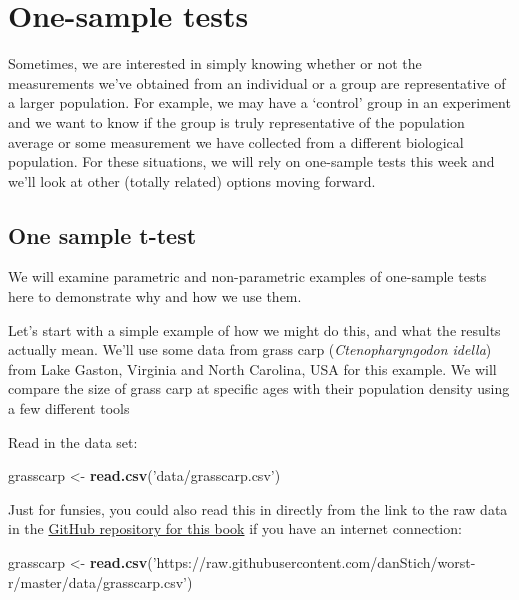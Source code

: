 \documentclass[
]{book}
\newenvironment{Shaded}{\begin{snugshade}}{\end{snugshade}}
\newcommand{\KeywordTok}[1]{\textcolor[rgb]{0.13,0.29,0.53}{\textbf{#1}}}
\newcommand{\NormalTok}[1]{#1}
\newcommand{\StringTok}[1]{\textcolor[rgb]{0.31,0.60,0.02}{#1}}
\begin{document}
\hypertarget{one-sample-tests}{%
\section{One-sample tests}\label{one-sample-tests}}

Sometimes, we are interested in simply knowing whether or not the measurements we've obtained from an individual or a group are representative of a larger population. For example, we may have a `control' group in an experiment and we want to know if the group is truly representative of the population average or some measurement we have collected from a different biological population. For these situations, we will rely on one-sample tests this week and we'll look at other (totally related) options moving forward.

\hypertarget{one-sample-t-test}{%
\subsection{One sample t-test}\label{one-sample-t-test}}

We will examine parametric and non-parametric examples of one-sample tests here to demonstrate why and how we use them.

Let's start with a simple example of how we might do this, and what the results actually mean. We'll use some data from grass carp (\emph{Ctenopharyngodon idella}) from Lake Gaston, Virginia and North Carolina, USA for this example. We will compare the size of grass carp at specific ages with their population density using a few different tools

Read in the data set:

\begin{Shaded}
\begin{Highlighting}[]
\NormalTok{  grasscarp <-}\StringTok{ }\KeywordTok{read.csv}\NormalTok{(}\StringTok{'data/grasscarp.csv'}\NormalTok{)}
\end{Highlighting}
\end{Shaded}

Just for funsies, you could also read this in directly from the link to the raw data in the \href{https://github.com/danStich/worst-r/tree/master/data}{GitHub repository for this book} if you have an internet connection:

\begin{Shaded}
\begin{Highlighting}[]
\NormalTok{grasscarp <-}\StringTok{ }\KeywordTok{read.csv}\NormalTok{(}\StringTok{'https://raw.githubusercontent.com/danStich/worst-r/master/data/grasscarp.csv'}\NormalTok{)}
\end{Highlighting}
\end{Shaded}
\end{document}
